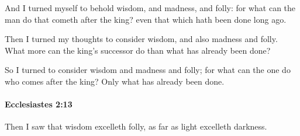 			\begin{versebox}
					\item[BHS] 
					\item[LXX] 
					\item[ASV] And I turned myself to behold wisdom, and madness, and folly: for what can the man do that cometh after the king? even that which hath been done long ago.
					\item[NIV] Then I turned my thoughts to consider wisdom, and also madness and folly. What more can the king’s successor do than what has already been done?
					\item[NRSV] So I turned to consider wisdom and madness and folly; for what can the one do who comes after the king? Only what has already been done.
			\end{versebox}

		\paragraph{Ecclesiastes 2:13} %
			\label{ECCLESIASTES-2-13}

			Then I saw that wisdom excelleth folly, as far as light excelleth darkness.

